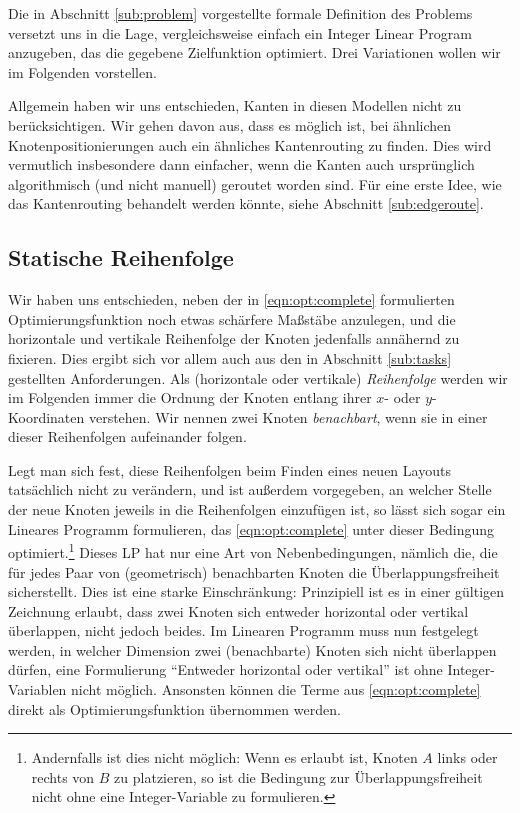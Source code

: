 Die in Abschnitt \ref{sub:problem} vorgestellte formale Definition des Problems versetzt uns in die Lage, vergleichsweise einfach ein Integer Linear Program anzugeben, das die gegebene Zielfunktion optimiert. Drei Variationen wollen wir im Folgenden vorstellen.

Allgemein haben wir uns entschieden, Kanten in diesen Modellen nicht zu berücksichtigen. Wir gehen davon aus, dass es möglich ist, bei ähnlichen Knotenpositionierungen auch ein ähnliches Kantenrouting zu finden. Dies wird vermutlich insbesondere dann einfacher, wenn die Kanten auch ursprünglich algorithmisch (und nicht manuell) geroutet worden sind. Für eine erste Idee, wie das Kantenrouting behandelt werden könnte, siehe Abschnitt \ref{sub:edgeroute}.

\subsection{Statische Reihenfolge}

Wir haben uns entschieden, neben der in \ref{eqn:opt:complete} formulierten Optimierungsfunktion noch etwas schärfere Maßstäbe anzulegen, und die horizontale und vertikale Reihenfolge der Knoten jedenfalls annähernd zu fixieren. Dies ergibt sich vor allem auch aus den in Abschnitt \ref{sub:tasks} gestellten Anforderungen. Als (horizontale oder vertikale) \textit{Reihenfolge} werden wir im Folgenden immer die Ordnung der Knoten entlang ihrer $x$- oder $y$-Koordinaten verstehen. Wir nennen zwei Knoten \textit{benachbart}, wenn sie in einer dieser Reihenfolgen aufeinander folgen.

Legt man sich fest, diese Reihenfolgen beim Finden eines neuen Layouts tatsächlich nicht zu verändern, und ist außerdem vorgegeben, an welcher Stelle der neue Knoten jeweils in die Reihenfolgen einzufügen ist, so lässt sich sogar ein Lineares Programm formulieren, das \ref{eqn:opt:complete} unter dieser Bedingung optimiert.\footnote{Andernfalls ist dies nicht möglich: Wenn es erlaubt ist, Knoten $A$ links oder rechts von $B$ zu platzieren, so ist die Bedingung zur Überlappungsfreiheit nicht ohne eine Integer-Variable zu formulieren.} Dieses LP hat nur eine Art von Nebenbedingungen, nämlich die, die für jedes Paar von (geometrisch) benachbarten Knoten die Überlappungsfreiheit sicherstellt. Dies ist eine starke Einschränkung: Prinzipiell ist es in einer gültigen Zeichnung erlaubt, dass zwei Knoten sich entweder horizontal oder vertikal überlappen, nicht jedoch beides. Im Linearen Programm muss nun festgelegt werden, in welcher Dimension zwei (benachbarte) Knoten sich nicht überlappen dürfen, eine Formulierung "`Entweder horizontal oder vertikal"' ist ohne Integer-Variablen nicht möglich. Ansonsten können die Terme aus \ref{eqn:opt:complete} direkt als Optimierungsfunktion übernommen werden.

